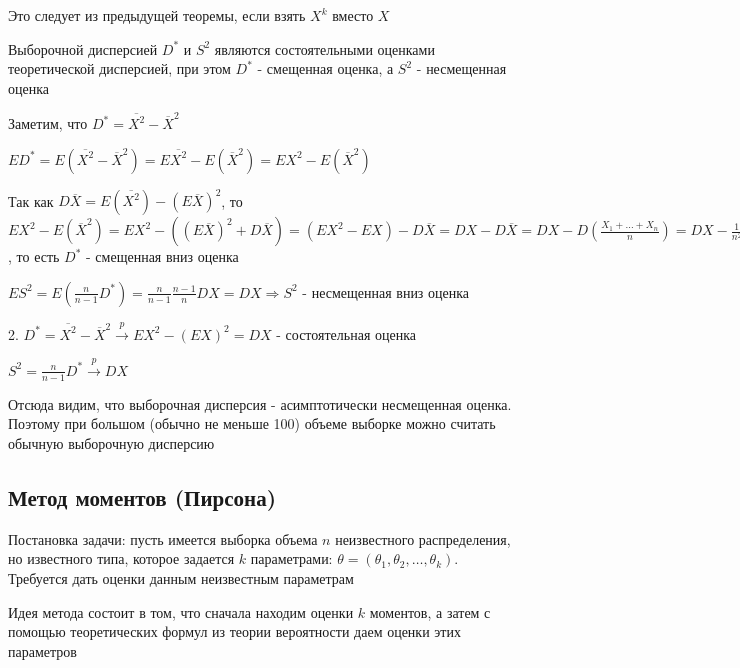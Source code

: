 \documentclass[12pt]{article}
\begin{document}
Это следует из предыдущей теоремы, если взять $X^k$ вместо $X$

\begin{MyTheorem}
    \Ths Выборочной дисперсией $D^*$ и $S^2$ являются состоятельными оценками теоретической дисперсией, при этом $D^*$ - смещенная оценка, а
    $S^2$ - несмещенная оценка
\end{MyTheorem}

\begin{MyProof}
    Заметим, что $D^* = \overline{X^2} - \overline{X}^2$

    $E D^* = E(\overline{X^2} - \overline{X}^2) = E\overline{X^2} - E (\overline{X}^2) = 
    E X^2 - E (\overline{X}^2)$

    Так как $D \overline{X} = E(\overline{X^2}) - (E \overline{X})^2$, то $E X^2 - E (\overline{X}^2) = 
    E X^2 - ((E\overline{X})^2 + D\overline{X}) = (E X^2 - EX) - D\overline{X} = D X - D \overline{X} = D X - D \left(\frac{X_1 + \dots + X_n}{n}\right) = 
    DX - \frac{1}{n^2} \sum_{i = 1}^n D X_i = DX - \frac{1}{n^2} n D X_1 = DX - \frac{1}{n} DX = \frac{n - 1}{n} DX$, то есть $D^*$ - смещенная вниз оценка

    $E S^2 = E(\frac{n}{n - 1} D^*) = \frac{n}{n - 1} \frac{n - 1}{n} DX = DX \Longrightarrow S^2$ - несмещенная вниз оценка 

    2. $D^* = \overline{X^2} - \overline{X}^2 \overset{p}{\longrightarrow} E X^2 - (E X)^2 = DX$ - состоятельная оценка

    $S^2 = \frac{n}{n - 1} D^* \overset{p}{\longrightarrow} DX$
\end{MyProof}

\Nota Отсюда видим, что выборочная дисперсия - асимптотически несмещенная оценка. Поэтому при большом (обычно не меньше 100) объеме выборке можно
считать обычную выборочную дисперсию

\subsection{Метод моментов (Пирсона)}

Постановка задачи: пусть имеется выборка объема $n$ неизвестного распределения, но известного типа,
которое задается $k$ параметрами: $\theta = (\theta_1, \theta_2, \dots, \theta_k)$. Требуется дать оценки данным
неизвестным параметрам

Идея метода состоит в том, что сначала находим оценки $k$ моментов, а затем с помощью теоретических формул
из теории вероятности даем оценки этих параметров
\end{document}
